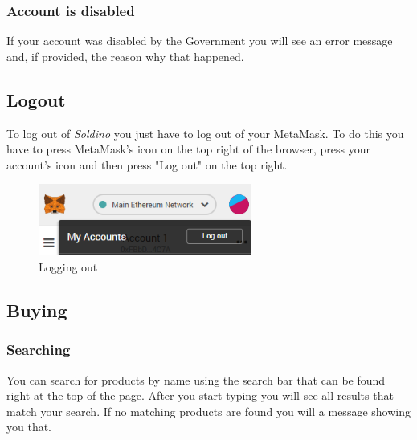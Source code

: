 		\subsubsection{Account is disabled}
		If your account was disabled by the Government you will see an error 
		message and, if provided, the reason why that happened.
	\subsection{Logout}
	To log out of \textit{Soldino} you just have to log out of 
	your MetaMask\glosp. To do this you have to press MetaMask's icon on the top 
	right of the browser, press your account's icon and then press "Log out"
	on the top right.
	\begin{figure}[H]
		\includegraphics[width=7cm]{res/images/logout_metamask.png}
		\centering
		\caption{Logging out}
	\end{figure}
	\subsection{Buying}
		\subsubsection{Searching}
		You can search for products by name using the search bar that can be found 
		right at the top of the page. After you start typing you will 
		see all results that match your search. If no matching products are 
		found you will a message showing you that.
